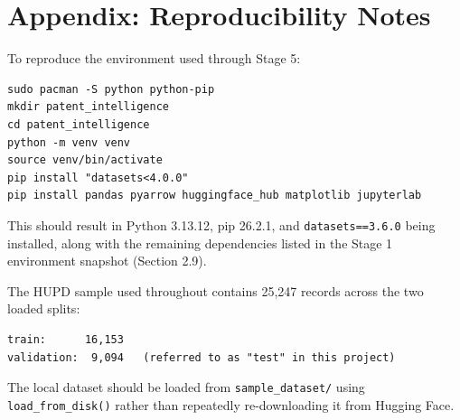\documentclass[11pt]{article}
\begin{document}
\section{Appendix: Reproducibility Notes}

To reproduce the environment used through Stage 5:

\begin{lstlisting}
sudo pacman -S python python-pip
mkdir patent_intelligence
cd patent_intelligence
python -m venv venv
source venv/bin/activate
pip install "datasets<4.0.0"
pip install pandas pyarrow huggingface_hub matplotlib jupyterlab
\end{lstlisting}

\noindent This should result in Python 3.13.12, pip 26.2.1, and \texttt{datasets==3.6.0} being installed, along with the remaining dependencies listed in the Stage 1 environment snapshot (Section 2.9).

\noindent The HUPD sample used throughout contains 25,247 records across the two loaded splits:

\begin{lstlisting}
train:      16,153
validation:  9,094   (referred to as "test" in this project)
\end{lstlisting}

\noindent The local dataset should be loaded from \texttt{sample\_dataset/} using \texttt{load\_from\_disk()} rather than repeatedly re-downloading it from Hugging Face.
\end{document}
